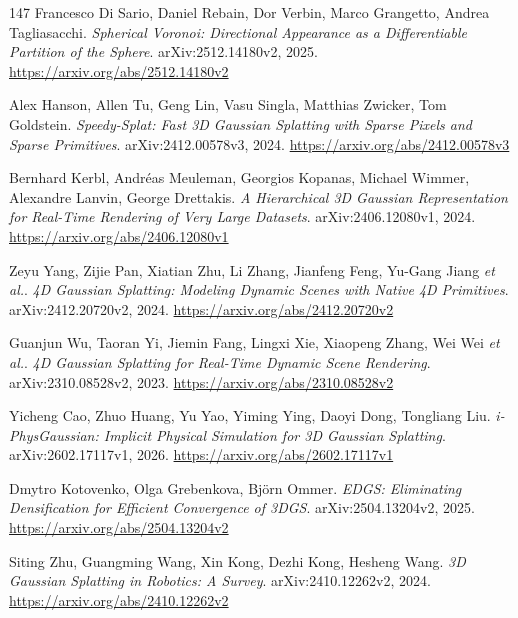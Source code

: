 \documentclass[11pt,a4paper]{article}
\begin{document}
\begin{thebibliography}{147}
Francesco Di Sario, Daniel Rebain, Dor Verbin, Marco Grangetto, Andrea Tagliasacchi.
\newblock \emph{Spherical Voronoi: Directional Appearance as a Differentiable Partition of the Sphere}.
\newblock arXiv:2512.14180v2, 2025.
\newblock \url{https://arxiv.org/abs/2512.14180v2}

Alex Hanson, Allen Tu, Geng Lin, Vasu Singla, Matthias Zwicker, Tom Goldstein.
\newblock \emph{Speedy-Splat: Fast 3D Gaussian Splatting with Sparse Pixels and Sparse Primitives}.
\newblock arXiv:2412.00578v3, 2024.
\newblock \url{https://arxiv.org/abs/2412.00578v3}

Bernhard Kerbl, Andr\'{e}as Meuleman, Georgios Kopanas, Michael Wimmer, Alexandre Lanvin, George Drettakis.
\newblock \emph{A Hierarchical 3D Gaussian Representation for Real-Time Rendering of Very Large Datasets}.
\newblock arXiv:2406.12080v1, 2024.
\newblock \url{https://arxiv.org/abs/2406.12080v1}

Zeyu Yang, Zijie Pan, Xiatian Zhu, Li Zhang, Jianfeng Feng, Yu-Gang Jiang \emph{et al.}.
\newblock \emph{4D Gaussian Splatting: Modeling Dynamic Scenes with Native 4D Primitives}.
\newblock arXiv:2412.20720v2, 2024.
\newblock \url{https://arxiv.org/abs/2412.20720v2}

Guanjun Wu, Taoran Yi, Jiemin Fang, Lingxi Xie, Xiaopeng Zhang, Wei Wei \emph{et al.}.
\newblock \emph{4D Gaussian Splatting for Real-Time Dynamic Scene Rendering}.
\newblock arXiv:2310.08528v2, 2023.
\newblock \url{https://arxiv.org/abs/2310.08528v2}

Yicheng Cao, Zhuo Huang, Yu Yao, Yiming Ying, Daoyi Dong, Tongliang Liu.
\newblock \emph{i-PhysGaussian: Implicit Physical Simulation for 3D Gaussian Splatting}.
\newblock arXiv:2602.17117v1, 2026.
\newblock \url{https://arxiv.org/abs/2602.17117v1}

Dmytro Kotovenko, Olga Grebenkova, Bj\"{o}rn Ommer.
\newblock \emph{EDGS: Eliminating Densification for Efficient Convergence of 3DGS}.
\newblock arXiv:2504.13204v2, 2025.
\newblock \url{https://arxiv.org/abs/2504.13204v2}

Siting Zhu, Guangming Wang, Xin Kong, Dezhi Kong, Hesheng Wang.
\newblock \emph{3D Gaussian Splatting in Robotics: A Survey}.
\newblock arXiv:2410.12262v2, 2024.
\newblock \url{https://arxiv.org/abs/2410.12262v2}


\end{thebibliography}
\end{document}
